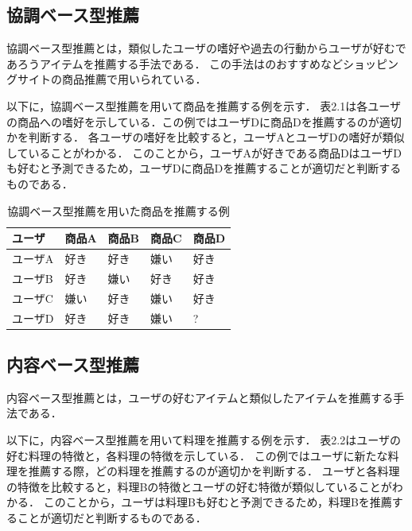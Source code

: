 \documentclass{funthesis}
\begin{document}
\subsection{協調ベース型推薦}
協調ベース型推薦とは，類似したユーザの嗜好や過去の行動からユーザが好むであろうアイテムを推薦する手法である．
この手法は\cite{10}のおすすめなどショッピングサイトの商品推薦で用いられている．

以下に，協調ベース型推薦を用いて商品を推薦する例を示す．
表2.1は各ユーザの商品への嗜好を示している．この例ではユーザDに商品Dを推薦するのが適切かを判断する．
各ユーザの嗜好を比較すると，ユーザAとユーザDの嗜好が類似していることがわかる．
このことから，ユーザAが好きである商品DはユーザDも好むと予測できるため，ユーザDに商品Dを推薦することが適切だと判断するものである．

\begin{table}[htb]
  \begin{center}
  \scriptsize
    \caption{協調ベース型推薦を用いた商品を推薦する例}
    \normalsize
   \begin{tabular}{p{2.5cm}||p{2.5cm}|p{2.5cm}|p{2.5cm}|p{2.5cm}}
    \hline
ユーザ & 商品A & 商品B & 商品C & 商品D \\ \hline\hline
      ユーザA & 好き & 好き & 嫌い & 好き \\ \hline
      ユーザB & 好き & 嫌い & 好き & 好き \\ \hline
      ユーザC & 嫌い & 好き & 嫌い & 好き \\ \hline
      ユーザD & 好き & 好き & 嫌い & ? \\ \hline
  \end{tabular}
  \end{center}
\end{table}

\subsection{内容ベース型推薦}
内容ベース型推薦とは，ユーザの好むアイテムと類似したアイテムを推薦する手法である．

以下に，内容ベース型推薦を用いて料理を推薦する例を示す．
表2.2はユーザの好む料理の特徴と，各料理の特徴を示している．
この例ではユーザに新たな料理を推薦する際，どの料理を推薦するのが適切かを判断する．
ユーザと各料理の特徴を比較すると，料理Bの特徴とユーザの好む特徴が類似していることがわかる．
このことから，ユーザは料理Bも好むと予測できるため，料理Bを推薦することが適切だと判断するものである．
\end{document}
